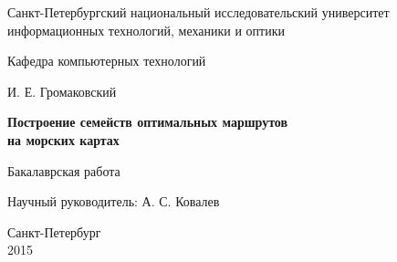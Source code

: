 \documentclass{report}
\theoremstyle{plain}
\theoremstyle{definition}
\numberwithin{theorem}{chapter}        %
\begin{document}

\initializefrontsections

\pagestyle{title}

\begin{center}
Санкт-Петербургский национальный исследовательский университет \\ информационных технологий, механики и оптики

\vspace{2cm}

Кафедра компьютерных технологий

\vspace{3cm}

{\Large И. Е. Громаковский}

\vspace{2cm}

\vbox{\LARGE\bfseries
Построение семейств оптимальных маршрутов \\ на морских картах}

\vspace{4cm}

Бакалаврская работа 

\vspace{1cm}

{\Large Научный руководитель: А. С. Ковалев}

\vspace{5cm}

Санкт-Петербург\\ 2015
\end{center}

\newpage

\setcounter{page}{2}
\pagestyle{plain}



\tableofcontents


\def\t#1{\mbox{\texttt{\hbox{#1}}}}
\def\b#1{\textbf{#1}}
\def\tb#1{\t{\b{#1}}}

\def\cln#1{\t{#1}}
\def\pcn#1{\t{#1}}
\newcommand{\p}{\par Здесь будет текст...}

\def\drawfigure#1#2#3{
        \begin{figure}[ht]
        \centerline{ \texttt{[image: img/\#1]}}
        \caption{#2}
        \label{#3}
        \end{figure}
}
\def\drawfigurex#1#2#3#4{
        \begin{figure}[ht]
        \centerline{ \texttt{[image: img/\#1]}}
        \caption{#2}
        \label{#3}
        \end{figure}
}

\startthechapters






%



\end{document}
